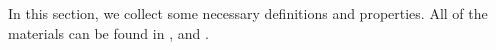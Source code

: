 \documentclass[reqno,12pt]{amsart}
\numberwithin{equation}{section}
\def\gp#1#2{\left[{#1\atop #2}\right]}  \def\Aut{\mbox{\rm Aut}\,}\def\mod{\mbox{\rm \textbf{mod}}\,}
\theoremstyle{plain} %
\theoremstyle{definition} %
\begin{document}
In this section, we collect some necessary definitions and properties. All of the materials can be
found in \cite{Br}, \cite{Sc} and \cite{Yan}.
\end{document}
